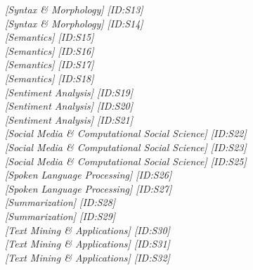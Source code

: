 \hfill \textit{[Syntax \& Morphology]  [ID:S13]} \\ 
\hfill \textit{[Syntax \& Morphology]  [ID:S14]} \\ 
\hfill \textit{[Semantics]  [ID:S15]} \\ 
\hfill \textit{[Semantics]  [ID:S16]} \\ 
\hfill \textit{[Semantics]  [ID:S17]} \\ 
\hfill \textit{[Semantics]  [ID:S18]} \\ 
\hfill \textit{[Sentiment Analysis]  [ID:S19]} \\ 
\hfill \textit{[Sentiment Analysis]  [ID:S20]} \\ 
\hfill \textit{[Sentiment Analysis]  [ID:S21]} \\ 
\hfill \textit{[Social Media \& Computational Social Science]  [ID:S22]} \\ 
\hfill \textit{[Social Media \& Computational Social Science]  [ID:S23]} \\ 
\hfill \textit{[Social Media \& Computational Social Science]  [ID:S25]} \\ 
\hfill \textit{[Spoken Language Processing]  [ID:S26]} \\ 
\hfill \textit{[Spoken Language Processing]  [ID:S27]} \\ 
\hfill \textit{[Summarization]  [ID:S28]} \\ 
\hfill \textit{[Summarization]  [ID:S29]} \\ 
\hfill \textit{[Text Mining \& Applications]  [ID:S30]} \\ 
\hfill \textit{[Text Mining \& Applications]  [ID:S31]} \\ 
\hfill \textit{[Text Mining \& Applications]  [ID:S32]} \\ 
